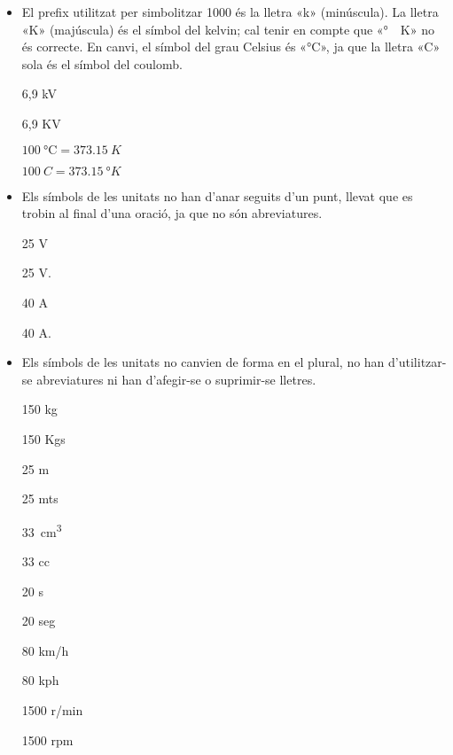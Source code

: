 \begin{itemize}

\item El prefix utilitzat per simbolitzar 1000 és la lletra «k» (minúscula).  La lletra «K» (majúscula) és el símbol del  kelvin; cal tenir en compte que «\si{\degree{}K}»  no és correcte. En canvi, el símbol del grau Celsius és «\si{\degreeCelsius}», ja que la lletra «C» sola és el símbol del coulomb.

\textcolor{Green}\faCheckSquare{} 6,9  kV

\textcolor{Red}\faTimesCircle{} 6,9 KV

\textcolor{Green}\faCheckSquare{} $\SI{100}{\degreeCelsius} = \SI{373,15}{K}$

\textcolor{Red}\faTimesCircle{} $\SI{100}{C} = \SI{373,15}{\degree K}$

\item Els símbols de les unitats no han d'anar seguits d'un punt, llevat que es trobin al final d'una oració, ja que no són
abreviatures.

\textcolor{Green}\faCheckSquare{} 25 V

\textcolor{Red}\faTimesCircle{} 25 V.

\textcolor{Green}\faCheckSquare{}  40 A

\textcolor{Red}\faTimesCircle{}  40 A.


\item Els símbols de les unitats no canvien de forma en el plural, no han
d'utilitzar-se abreviatures ni han d'afegir-se o suprimir-se
lletres.

\textcolor{Green}\faCheckSquare{} 150 kg

\textcolor{Red}\faTimesCircle{} 150 Kgs

\textcolor{Green}\faCheckSquare{} 25 m

\textcolor{Red}\faTimesCircle{} 25 mts

\textcolor{Green}\faCheckSquare{} \SI{33}{cm^3}

\textcolor{Red}\faTimesCircle{} 33 cc

\textcolor{Green}\faCheckSquare{} 20 s

\textcolor{Red}\faTimesCircle{} 20 seg

\textcolor{Green}\faCheckSquare{} 80 km/h

\textcolor{Red}\faTimesCircle{} 80 kph

\textcolor{Green}\faCheckSquare{} 1500 r/min

\textcolor{Red}\faTimesCircle{} 1500 rpm


\end{itemize}

